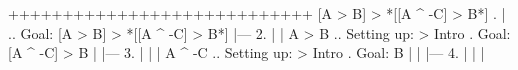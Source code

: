 \argument

++++++++++++++++++++++++++++
 [A > B] > *[[A ^ -C] > B*]
\endargument
        \answer
        . |                 ..  Goal: [A > B] > *[[A ^ -C] > B*]
            |---
         2. |   | A > B       ..  Setting up: > Intro  .  Goal: [A ^ -C] > B
            |   |---
         3. |   |   | A ^ -C  ..  Setting up: > Intro  .  Goal: B
            |   |   |---
         4. |   |   | 
        \endfitchproof
        \endanswer

\endproblems
\bye
